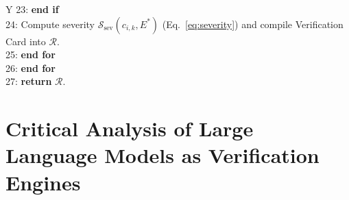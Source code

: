 \documentclass[journal]{IEEEtran}
\begin{document}
\begin{table}[t]
\begin{tabularx}{\columnwidth}{Y}
23: \hspace{1.3em} \textbf{end if} \\
24: \hspace{1.3em} Compute severity $\mathcal{S}_{\text{sev}}(c_{i,k}, E^*)$ (Eq.~\ref{eq:severity}) and compile Verification Card into $\mathcal{R}$. \\
25: \hspace{0.5em} \textbf{end for} \\
26: \textbf{end for} \\
27: \textbf{return} $\mathcal{R}$. \\
\bottomrule
\end{tabularx}
\end{table}

\section{Critical Analysis of Large Language Models as Verification Engines}
\label{sec:llm_critique}
\end{document}
